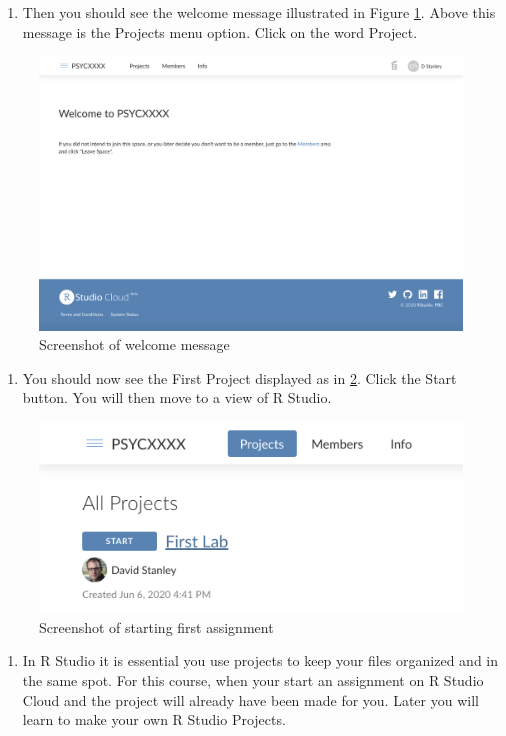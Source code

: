 \documentclass[
]{krantz}
\providecommand{\tightlist}{%
  \setlength{\itemsep}{0pt}\setlength{\parskip}{0pt}}
\begin{document}
\begin{enumerate}
\def\labelenumi{\arabic{enumi}.}
\setcounter{enumi}{3}
\tightlist
\item
  Then you should see the welcome message illustrated in Figure \ref{fig:welcome}. Above this message is the Projects menu option. Click on the word Project.
\end{enumerate}

\begin{figure}
\includegraphics[width=0.7\linewidth]{ch_introduction/images/screenshot_welcome} \caption{Screenshot of welcome message}\label{fig:welcome}
\end{figure}

\begin{enumerate}
\def\labelenumi{\arabic{enumi}.}
\setcounter{enumi}{4}
\tightlist
\item
  You should now see the First Project displayed as in \ref{fig:assignment}. Click the Start button. You will then move to a view of R Studio.
\end{enumerate}

\begin{figure}
\includegraphics[width=0.7\linewidth]{ch_introduction/images/screenshot_assignment} \caption{Screenshot of starting first assignment}\label{fig:assignment}
\end{figure}

\begin{enumerate}
\def\labelenumi{\arabic{enumi}.}
\setcounter{enumi}{4}
\tightlist
\item
  In R Studio it is essential you use projects to keep your files organized and in the same spot. For this course, when your start an assignment on R Studio Cloud and the project will already have been made for you. Later you will learn to make your own R Studio Projects.
\end{enumerate}
\end{document}
